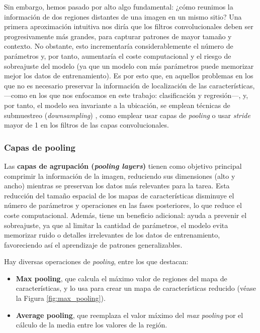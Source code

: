 Sin embargo, hemos pasado por alto algo fundamental: ¿cómo reunimos la información de dos regiones distantes 
de una imagen en un mismo sitio? Una primera aproximación intuitiva nos diría que los filtros convolucionales 
deben ser progresivamente más grandes, para capturar patrones de mayor tamaño y contexto. No obstante, esto
incrementaría considerablemente el número de parámetros y, por tanto, aumentaría el coste computacional y 
el riesgo de sobreajuste del modelo (ya que un modelo con más parámetros puede memorizar mejor los
datos de entrenamiento). Es por esto que, en aquellos problemas en los que no es necesario preservar la 
información de localización de las características, ---como en los que nos enfocamos en este trabajo: 
clasificación y regresión---, y, por tanto, el modelo sea invariante a la ubicación, se emplean técnicas de 
submuestreo (\textit{downsampling}) \cite{murphy2022}, como emplear usar capas de \textit{pooling} o usar \textit{stride} mayor de 1 en los filtros de las capas convolucionales.





\subsubsection{Capas de pooling}

Las \textbf{capas de agrupación (\textit{pooling layers})} tienen como objetivo principal comprimir la 
información de la imagen, reduciendo sus dimensiones (alto y ancho) mientras se preservan los datos más 
relevantes para la tarea. Esta reducción del tamaño espacial de los mapas de características disminuye el 
número de parámetros y operaciones en las fases posteriores, lo que reduce el coste computacional. Además, 
tiene un beneficio adicional: ayuda a prevenir el sobreajuste, ya que al limitar la cantidad de parámetros, 
el modelo evita memorizar ruido o detalles irrelevantes de los datos de entrenamiento, favoreciendo así el 
aprendizaje de patrones generalizables.

Hay diversas operaciones de \textit{pooling}, entre los que destacan:

\begin{itemize}

    \item \textbf{Max pooling}, que calcula el máximo valor de regiones del mapa de características, y lo
    usa para crear un mapa de características reducido (véase la Figura \ref{fig:max_pooling}).

    \item \textbf{Average pooling}, que reemplaza el valor máximo del \textit{max pooling} por el cálculo de
    la media entre los valores de la región. 

\end{itemize}

